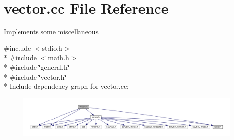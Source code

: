 \section{vector.\+cc File Reference}
\label{vector_8cc}


Implements some miscellaneous.  


{\ttfamily \#include $<$stdio.\+h$>$}\\*
{\ttfamily \#include $<$math.\+h$>$}\\*
{\ttfamily \#include \char`\"{}general.\+h\char`\"{}}\\*
{\ttfamily \#include \char`\"{}vector.\+h\char`\"{}}\\*
Include dependency graph for vector.\+cc\+:
\nopagebreak
\begin{figure}[H]
\begin{center}
\leavevmode
\includegraphics[width=350pt]{vector_8cc__incl}
\end{center}
\end{figure}
